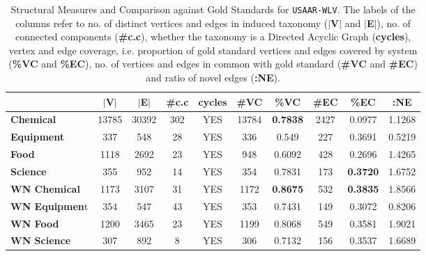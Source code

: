 \begin{table}[H]
\small
\centering
    \begin{tabular}{l|cccc|ccccc}
                 & \textbf{$\vert$V$\vert$}   & \textbf{$\vert$E$\vert$}   & \textbf{\#c.c} & \textbf{cycles} & \textbf{\#VC} & \textbf{\%VC} & \textbf{\#EC} & \textbf{\%EC} & \textbf{:NE} \\ \hline
    \textbf{Chemical}     & 13785 & 30392 & 302    & YES    & 13784                 & \textbf{0.7838}          & 2427               & 0.0977        & 1.1268               \\
    \textbf{Equipment}    & 337   & 548   & 28     & YES    & 336                   & 0.549           & 227                & 0.3691        & 0.5219               \\
    \textbf{Food}         & 1118  & 2692  & 23     & YES    & 948                   & 0.6092          & 428                & 0.2696        & 1.4265               \\
    \textbf{Science}      & 355   & 952   & 14     & YES    & 354                   & 0.7831          & 173                & \textbf{0.3720}         & 1.6752               \\ \hline
   \textbf{WN Chemical}  & 1173  & 3107  & 31     & YES    & 1172                  & \textbf{0.8675}          & 532                & \textbf{0.3835}       & 1.8566               \\
    \textbf{WN Equipmen}t & 354   & 547   & 43     & YES    & 353                   & 0.7431          & 149                & 0.3072        & 0.8206               \\
    \textbf{WN Food }     & 1200  & 3465  & 23     & YES    & 1199                  & 0.8068          & 549                & 0.3581        & 1.9021               \\
   \textbf{WN Science }  & 307   & 892   & 8      & YES    & 306                   & 0.7132          & 156                & 0.3537        & 1.6689               \\
    \end{tabular}
    \caption{Structural Measures and Comparison against Gold Standards for {\tt USAAR-WLV}. The labels of the columns refer to 
no. of distinct vertices and edges in induced taxonomy (\textbf{$\vert$V$\vert$} and \textbf{$\vert$E$\vert$}), 
no. of connected components (\textbf{\#c.c}), whether the taxonomy is a Directed Acyclic Graph (\textbf{cycles}),
vertex and edge coverage, i.e. proportion of gold  standard vertices and edges covered by system (\textbf{\%VC} and \textbf{\%EC}), 
no. of vertices and edges in common with gold standard (\textbf{\#VC} and \textbf{\#EC}) and ratio of novel edges (\textbf{:NE}).}
\end{table}

